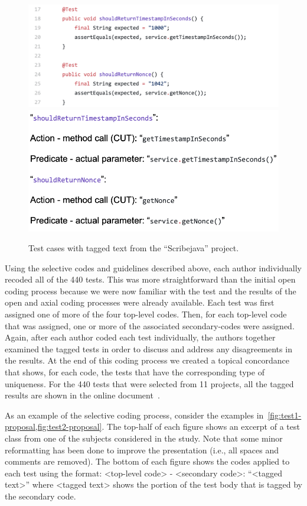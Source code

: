 \documentclass[proposal.tex]{subfiles}
\begin{document}
\begin{figure}[t]
\centering
\includegraphics[scale=0.45]{figures/sp3-proposal.png}
\includegraphics[scale=0.45]{figures/sp1-proposal.png}
\caption{Test cases with tagged text from the \enquote{Scribejava} project.}
\label{fig:test1-proposal}
\end{figure}

Using the selective codes and guidelines described above, each author individually recoded all of the 440 tests.
%
This was more straightforward than the initial open coding process because we were now familiar with the test and the results of the open and axial coding processes were already available.
%
Each test was first assigned one of more of the four top-level codes.  Then, for each top-level code that was assigned, one or more of the associated secondary-codes were assigned.
%
Again, after each author coded each test individually, the authors together examined the tagged tests in order to discuss and address any disagreements in the results.
%
At the end of this coding process we created a topical concordance that shows, for each code, the tests that have the corresponding type of uniqueness.
%
For the 440 tests that were selected from 11 projects, all the tagged results are shown in the online document~\cite{emp-study}. 


As an example of the selective coding process, consider the examples in~\cref{fig:test1-proposal,fig:test2-proposal}.
%
The top-half of each figure shows an excerpt of a test class from one of the subjects considered in the study.
%
Note that some minor reformatting has been done to improve the presentation (i.e., all spaces and comments are removed).
%
The bottom of each figure shows the codes applied to each test using the format: <top-level code> - <secondary code>: \enquote{<tagged text>} where <tagged text> shows the portion of the test body that is tagged by the secondary code.
\end{document}
